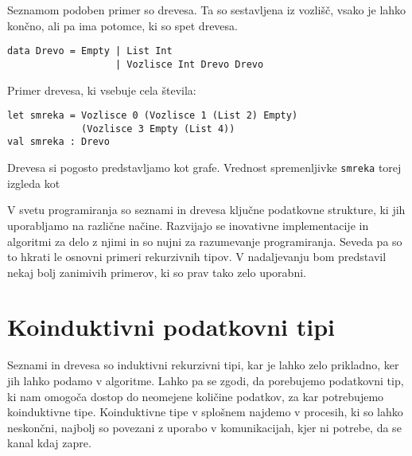 \documentclass[12pt,a4paper,openany]{book}
\begin{document}
Seznamom podoben primer so drevesa. Ta so sestavljena iz vozlišč, vsako je lahko končno, ali pa ima potomce, ki so spet drevesa.
\begin{lstlisting}
data Drevo = Empty | List Int 
                   | Vozlisce Int Drevo Drevo
\end{lstlisting}
Primer drevesa, ki vsebuje cela števila:
\begin{lstlisting}
let smreka = Vozlisce 0 (Vozlisce 1 (List 2) Empty)
             (Vozlisce 3 Empty (List 4))
val smreka : Drevo
\end{lstlisting}
Drevesa si pogosto predstavljamo kot grafe. Vrednost spremenljivke \lstinline{smreka} torej izgleda kot
\begin{center} 
\end{center}

V svetu programiranja so seznami in drevesa ključne podatkovne strukture, ki jih uporabljamo na različne načine. Razvijajo se inovativne implementacije in algoritmi za delo z njimi in so nujni za razumevanje programiranja.
Seveda pa so to hkrati le osnovni primeri rekurzivnih tipov. V nadaljevanju bom predstavil nekaj bolj zanimivih primerov, ki so prav tako zelo uporabni.

\section{Koinduktivni podatkovni tipi}
Seznami in drevesa so induktivni rekurzivni tipi, kar je lahko zelo prikladno, ker jih lahko podamo v algoritme. Lahko pa se zgodi, da porebujemo podatkovni tip, ki nam omogoča dostop do 
neomejene količine podatkov, za kar potrebujemo koinduktivne tipe. Koinduktivne tipe v splošnem najdemo v procesih, ki so lahko neskončni, najbolj so povezani z uporabo v komunikacijah, kjer ni potrebe, da se kanal kdaj zapre.
\end{document}
